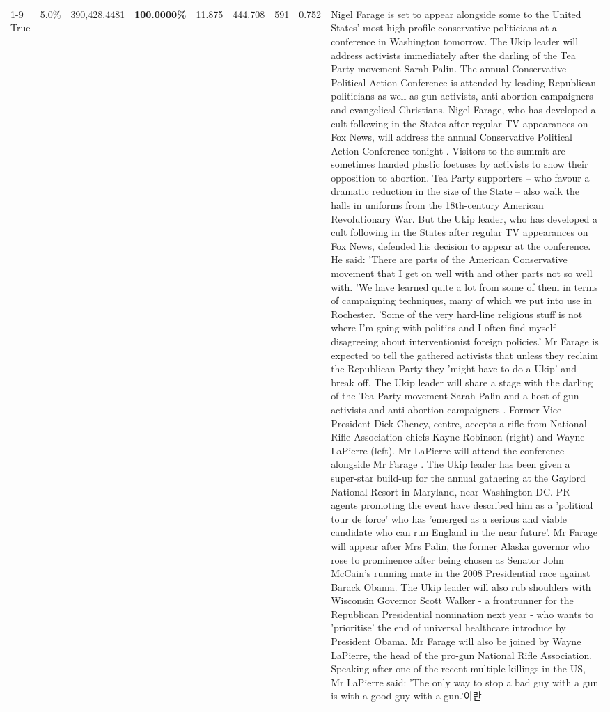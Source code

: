 \begin{table}[H]
\begin{tabular}{lllrlllll}
\cline{1-9}
True & 5.0\% & 390,428.4481 & \bfseries \color{red} 100.0000\% & 11.875 & 444.708 & 591 & 0.752 & Nigel Farage is set to appear alongside some to the United States' most high-profile conservative politicians at a conference in Washington tomorrow. The Ukip leader will address activists immediately after the darling of the Tea Party movement Sarah Palin. The annual Conservative Political Action Conference is attended by leading Republican politicians as well as gun activists, anti-abortion campaigners and evangelical Christians. Nigel Farage, who has developed a cult following in the States after regular TV appearances on Fox News, will address the annual Conservative Political Action Conference tonight . Visitors to the summit are sometimes handed plastic foetuses by activists to show their opposition to abortion. Tea Party supporters – who favour a dramatic reduction in the size of the State – also walk the halls in uniforms from the 18th-century American Revolutionary War. But the Ukip leader, who has developed a cult following in the States after regular TV appearances on Fox News, defended his decision to appear at the conference. He said: 'There are parts of the American Conservative movement that I get on well with and other parts not so well with. 'We have learned quite a lot from some of them in terms of campaigning techniques, many of which we put into use in Rochester. 'Some of the very hard-line religious stuff is not where I'm going with politics and I often find myself disagreeing about interventionist foreign policies.' Mr Farage is expected to tell the gathered activists that unless they reclaim the Republican Party they 'might have to do a Ukip' and break off. The Ukip leader will share a stage with the darling of the Tea Party movement Sarah Palin and a host of gun activists and anti-abortion campaigners . Former Vice President Dick Cheney, centre, accepts a rifle from National Rifle Association chiefs Kayne Robinson (right) and Wayne LaPierre (left). Mr LaPierre will attend the conference alongside Mr Farage . The Ukip leader has been given a super-star build-up for the annual gathering at the Gaylord National Resort in Maryland, near Washington DC. PR agents promoting the event have described him as a 'political tour de force' who has 'emerged as a serious and viable candidate who can run England in the near future'. Mr Farage will appear after Mrs Palin, the former Alaska governor who rose to prominence after being chosen as Senator John McCain's running mate in the 2008 Presidential race against Barack Obama. The Ukip leader will also rub shoulders with Wisconsin Governor Scott Walker - a frontrunner for the Republican Presidential nomination next year - who wants to 'prioritise' the end of universal healthcare introduce by President Obama. Mr Farage will also be joined by Wayne LaPierre, the head of the pro-gun National Rifle Association. Speaking after one of the recent multiple killings in the US, Mr LaPierre said: 'The only way to stop a bad guy with a gun is with a good guy with a gun.'이란 \\

\end{tabular}
\end{table}
